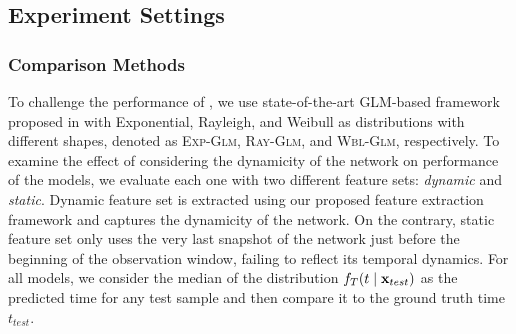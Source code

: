 \subsection{Experiment Settings}
\subsubsection{Comparison Methods}
To challenge the performance of \npglm, we use state-of-the-art GLM-based framework proposed in \cite{sun2012will} with Exponential, Rayleigh, and Weibull as distributions with different shapes, denoted as \textsc{Exp-Glm}, \textsc{Ray-Glm}, and \textsc{Wbl-Glm}, respectively. To examine the effect of considering the dynamicity of the network on performance of the models, we evaluate each one with two different feature sets: \emph{dynamic} and \emph{static}. Dynamic feature set is extracted using our proposed feature extraction framework and captures the dynamicity of the network. On the contrary, static feature set only uses the very last snapshot of the network just before the beginning of the observation window, failing to reflect its temporal dynamics. For all models, we consider the median of the distribution $f_T(t\mid\mathbf{x}_{test})$ as the predicted time for any test sample and then compare it to the ground truth time $t_{test}$.
